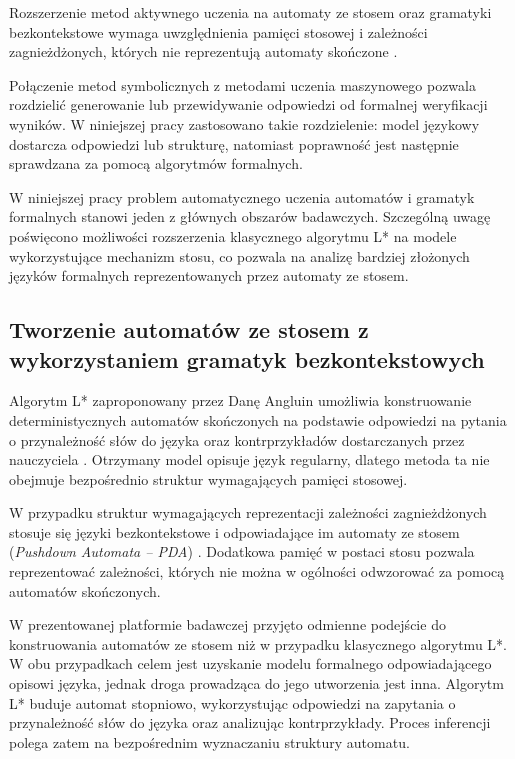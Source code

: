 \documentclass[12pt]{article}
\begin{document}
Rozszerzenie metod aktywnego uczenia na automaty ze stosem oraz gramatyki bezkontekstowe wymaga uwzględnienia pamięci stosowej i zależności zagnieżdżonych, których nie reprezentują automaty skończone \cite{hopcroft2007,sipser2012}.

Połączenie metod symbolicznych z metodami uczenia maszynowego pozwala rozdzielić generowanie lub przewidywanie odpowiedzi od formalnej weryfikacji wyników. W niniejszej pracy zastosowano takie rozdzielenie: model językowy dostarcza odpowiedzi lub strukturę, natomiast poprawność jest następnie sprawdzana za pomocą algorytmów formalnych.

W niniejszej pracy problem automatycznego uczenia automatów i gramatyk formalnych stanowi jeden z głównych obszarów badawczych. Szczególną uwagę poświęcono możliwości rozszerzenia klasycznego algorytmu L* na modele wykorzystujące mechanizm stosu, co pozwala na analizę bardziej złożonych języków formalnych reprezentowanych przez automaty ze stosem.

\subsection{Tworzenie automatów ze stosem z wykorzystaniem gramatyk bezkontekstowych}

Algorytm L* zaproponowany przez Danę Angluin umożliwia konstruowanie deterministycznych automatów skończonych na podstawie odpowiedzi na pytania o przynależność słów do języka oraz kontrprzykładów dostarczanych przez nauczyciela \cite{angluin1987}. Otrzymany model opisuje język regularny, dlatego metoda ta nie obejmuje bezpośrednio struktur wymagających pamięci stosowej.

W przypadku struktur wymagających reprezentacji zależności zagnieżdżonych stosuje się języki bezkontekstowe i odpowiadające im automaty ze stosem (\textit{Pushdown Automata -- PDA}) \cite{hopcroft2007,sipser2012}. Dodatkowa pamięć w postaci stosu pozwala reprezentować zależności, których nie można w ogólności odwzorować za pomocą automatów skończonych.

W prezentowanej platformie badawczej przyjęto odmienne podejście do konstruowania automatów ze stosem niż w przypadku klasycznego algorytmu L*. W obu przypadkach celem jest uzyskanie modelu formalnego odpowiadającego opisowi języka, jednak droga prowadząca do jego utworzenia jest inna. Algorytm L* buduje automat stopniowo, wykorzystując odpowiedzi na zapytania o przynależność słów do języka oraz analizując kontrprzykłady. Proces inferencji polega zatem na bezpośrednim wyznaczaniu struktury automatu.
\end{document}
